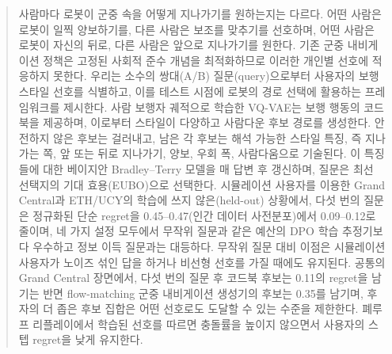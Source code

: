 \begin{abstract}
사람마다 로봇이 군중 속을 어떻게 지나가기를 원하는지는 다르다. 어떤 사람은 로봇이 일찍 양보하기를, 다른 사람은 보조를 맞추기를 선호하며,
어떤 사람은 로봇이 자신의 뒤로, 다른 사람은 앞으로 지나가기를 원한다. 기존 군중 내비게이션 정책은 고정된 사회적 준수 개념을
최적화하므로 이러한 개인별 선호에 적응하지 못한다. 우리는 소수의 쌍대(A/B) 질문(query)으로부터 사용자의 보행 스타일 선호를
식별하고, 이를 테스트 시점에 로봇의 경로 선택에 활용하는 프레임워크를 제시한다. 사람 보행자 궤적으로 학습한 VQ-VAE는
보행 행동의 코드북을 제공하며, 이로부터 스타일이 다양하고 사람다운 후보 경로를 생성한다.
안전하지 않은 후보는 걸러내고, 남은 각 후보는 해석 가능한 스타일 특징, 즉 지나가는 쪽, 앞 또는 뒤로 지나가기, 양보,
우회 폭, 사람다움으로 기술된다. 이 특징들에 대한 베이지안 Bradley--Terry 모델을 매 답변 후 갱신하며,
질문은 최선 선택지의 기대 효용(EUBO)으로 선택한다. 시뮬레이션 사용자를 이용한 Grand Central과 ETH/UCY의 학습에 쓰지 않은(held-out) 상황에서,
다섯 번의 질문은 정규화된 단순 regret을 0.45--0.47(인간 데이터 사전분포)에서 0.09--0.12로 줄이며,
네 가지 설정 모두에서 무작위 질문과 같은 예산의 DPO 학습 추정기보다 우수하고 정보 이득 질문과는 대등하다.
무작위 질문 대비 이점은 시뮬레이션 사용자가 노이즈 섞인 답을 하거나 비선형 선호를 가질 때에도 유지된다. 공통의
Grand Central 장면에서, 다섯 번의 질문 후 코드북 후보는 0.11의 regret을 남기는 반면 flow-matching 군중 내비게이션
생성기의 후보는 0.35를 남기며, 후자의 더 좁은 후보 집합은 어떤 선호로도 도달할 수 있는 수준을 제한한다. 폐루프 리플레이에서
학습된 선호를 따르면 충돌률을 높이지 않으면서 사용자의 스텝 regret을 낮게 유지한다.
\end{abstract}
